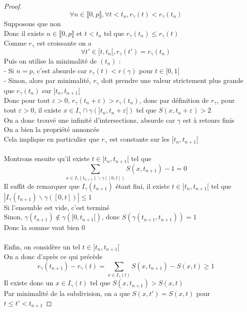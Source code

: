 \documentclass{article}
\begin{document}
\begin{flushleft}
\begin{proof}
\begin{equation}
    \forall n \in \llbracket 0, p \rrbracket, \forall t < t_n, r_{\gamma}(t) < r_{\gamma}(t_n)
\end{equation}
Supposons que non\\
Donc il existe $n \in \llbracket 0, p \rrbracket$ et $t < t_n$ tel que $r_{\gamma}(t_n) \leq r_{\gamma}(t)$\\
Comme $r_{\gamma}$ est croissante on a
\[\forall t' \in [t, t_n[, r_{\gamma}(t') = r_{\gamma}(t_n)\]
Puis on utilise la minimalité de $(t_n)$ :\\
- Si $n = p$, c'est absurde car $r_{\gamma}(t) < r(\gamma)$ pour $t \in [0, 1[$\\
- Sinon, alors par minimalité, $r_{\gamma}$ doit prendre une valeur strictement plus grande
que $r_{\gamma}(t_n)$ sur $]t_n, t_{n+1}[$\\
Donc pour tout $\varepsilon > 0$, $r_{\gamma}(t_n + \varepsilon) > r_{\gamma}(t_n)$, donc
par définition de $r_{\gamma}$, pour tout $\varepsilon > 0$, il existe $x \in I_{\gamma}
\cap \gamma(]t_n, t_n + \varepsilon[)$ tel que $S(x, t_n + \varepsilon) > 2$\\
On a donc trouvé une infinité d'intersections, absurde car $\gamma$ est à retours finis\\
On a bien la propriété annoncée\\
Cela implique en particulier que $r_{\gamma}$ est constante sur les $[t_n, t_{n+1}[$
\\~\\
Montrons ensuite qu'il existe $t \in [t_n, t_{n+1}[$ tel que
\[ \sum_{x \in I_{\gamma}(t_{n+1}) \backslash \gamma([0, t])} S(x, t_{n+1}) - 1 = 0\]
Il suffit de remarquer que $I_{\gamma}(t_{n+1})$ étant fini, il existe $t \in [t_n, t_{n+1}[$ tel que
$|I_{\gamma}(t_{n+1}) \backslash \gamma([0, t])| \leq 1$\\
Si l'ensemble est vide, c'est terminé\\
Sinon, $\gamma(t_{n+1}) \notin \gamma([0, t_{n+1}[)$, donc $S(\gamma(t_{n+1}, t_{n+1})) = 1$\\
Donc la somme vaut bien 0
\\~\\
Enfin, on considère un tel $t \in [t_n, t_{n+1}[$\\
On a donc d'après ce qui précède
\[ r_{\gamma}(t_{n+1}) - r_{\gamma}(t) = \sum_{x \in I_{\gamma}(t)} S(x, t_{n+1}) - S(x, t) \geq 1\]
Il existe donc un $x \in I_{\gamma}(t)$ tel que $S(x, t_{n+1}) > S(x, t)$\\
Par minimalité de la subdivision, on a que $S(x, t') = S(x, t)$ pour $t \leq t' < t_{n+1}$

\end{proof}
\end{flushleft}
\end{document}
